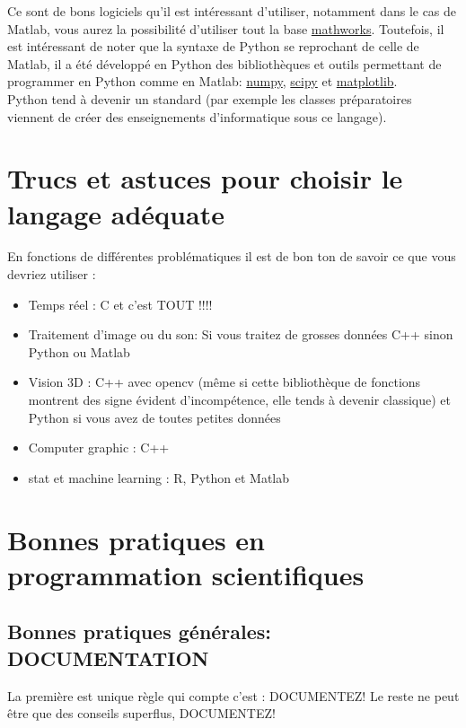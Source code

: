 Ce sont de bons logiciels qu'il est intéressant d'utiliser, notamment dans le cas de Matlab, 
vous aurez la possibilité d'utiliser tout la base \href{http://www.mathworks.fr/matlabcentral/fileexchange}{mathworks}.
Toutefois, il est intéressant de noter que la syntaxe de Python se reprochant de celle de Matlab, il a 
été développé en Python des bibliothèques et outils permettant de programmer en Python comme en Matlab: 
\href{http://www.numpy.org/}{numpy}, \href{http://www.scipy.org/}{scipy} et \href{http://matplotlib.org/}{matplotlib}.\\

Python tend à devenir un standard (par exemple les classes préparatoires viennent de créer 
des enseignements d'informatique sous ce langage).


\section{Trucs et astuces pour choisir le langage adéquate}

En fonctions de différentes problématiques il est de bon ton de savoir ce que vous devriez utiliser :

\begin{itemize}
\item Temps réel : C et c'est TOUT !!!!
\item Traitement d'image ou du son: Si vous traitez de grosses données C++ sinon Python ou Matlab
\item Vision 3D : C++ avec opencv (même si cette bibliothèque de fonctions montrent des signe 
évident d'incompétence, elle tends à devenir classique) et Python si vous avez de toutes petites données
\item Computer graphic : C++ 
\item stat et machine learning : R, Python et Matlab
\end{itemize}  

\section{Bonnes pratiques en programmation scientifiques}

\subsection{Bonnes pratiques générales: DOCUMENTATION}

La première est unique règle qui compte c'est : DOCUMENTEZ!
Le reste ne peut être que des conseils superflus, DOCUMENTEZ! 

